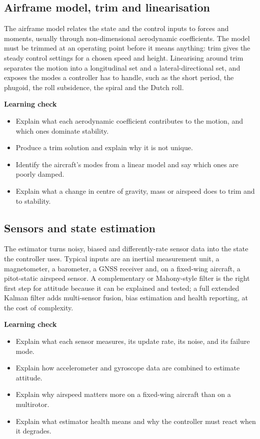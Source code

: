 \documentclass[11pt,a4paper]{article}
\begin{document}
\subsection{Airframe model, trim and linearisation}

The airframe model relates the state and the control inputs to forces and
moments, usually through non-dimensional aerodynamic coefficients. The model
must be trimmed at an operating point before it means anything: trim gives the
steady control settings for a chosen speed and height. Linearising around trim
separates the motion into a longitudinal set and a lateral-directional set, and
exposes the modes a controller has to handle, such as the short period, the
phugoid, the roll subsidence, the spiral and the Dutch roll.

\textbf{Learning check}
\begin{itemize}
  \item Explain what each aerodynamic coefficient contributes to the motion, and which ones dominate stability.
  \item Produce a trim solution and explain why it is not unique.
  \item Identify the aircraft's modes from a linear model and say which ones are poorly damped.
  \item Explain what a change in centre of gravity, mass or airspeed does to trim and to stability.
\end{itemize}

\subsection{Sensors and state estimation}

The estimator turns noisy, biased and differently-rate sensor data into the
state the controller uses. Typical inputs are an inertial measurement unit, a
magnetometer, a barometer, a GNSS receiver and, on a fixed-wing aircraft, a
pitot-static airspeed sensor. A complementary or Mahony-style filter is the
right first step for attitude because it can be explained and tested; a full
extended Kalman filter adds multi-sensor fusion, bias estimation and health
reporting, at the cost of complexity.

\textbf{Learning check}
\begin{itemize}
  \item Explain what each sensor measures, its update rate, its noise, and its failure mode.
  \item Explain how accelerometer and gyroscope data are combined to estimate attitude.
  \item Explain why airspeed matters more on a fixed-wing aircraft than on a multirotor.
  \item Explain what estimator health means and why the controller must react when it degrades.
\end{itemize}
\end{document}
